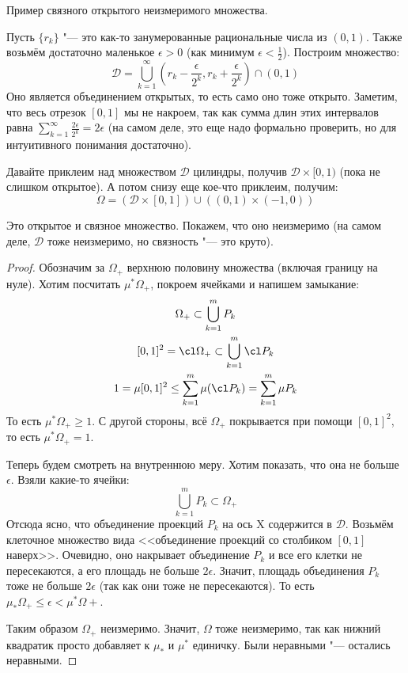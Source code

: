\begin{exmp}
	Пример связного открытого неизмеримого множества.

	Пусть $\{ r_k \}$ "--- это как-то занумерованные рациональные числа из $(0,1)$.
	Также возьмём достаточно маленькое $\epsilon > 0$ (как минимум $\epsilon < \frac 1 2$).
	Построим множество:
	\[
	\mathcal{D} = \bigcup_{k=1}^\infty \left(r_k - \frac{\epsilon}{2^k}, r_k + \frac{\epsilon}{2^k}\right) \cap (0,1)
	\]
	Оно является объединением открытых, то есть само оно тоже открыто.
	Заметим, что весь отрезок $[0,1]$ мы не накроем, так как сумма длин этих интервалов равна
	$\sum_{k=1}^\infty \frac{2\epsilon}{2^k} = 2\epsilon$
	(на самом деле, это еще надо формально проверить, но для интуитивного понимания достаточно).

	Давайте приклеим над множеством $\mathcal{D}$ цилиндры, получив $\mathcal{D} \times [0,1)$
	(пока не слишком открытое).
	А потом снизу еще кое-что приклеим, получим:
	\[ \Omega = (\mathcal{D} \times [0,1]) \cup ((0,1) \times (-1, 0)) \]
	\begin{center}
	
	\end{center}
	Это открытое и связное множество.
	Покажем, что оно неизмеримо (на самом деле, $\mathcal{D}$ тоже неизмеримо, но связность "--- это круто).
\end{exmp}
\begin{proof}
	Обозначим за $\Omega_+$ верхнюю половину множества (включая границу на нуле).
	Хотим посчитать $\mu^* \Omega_+$, покроем ячейками и напишем замыкание:
	\begin{gather*}
		\Omega_+ \subset \bigcup_{k=1}^m P_k \\
		[0,1]^2 = \cl \Omega_+ \subset \bigcup_{k=1}^m \cl P_k \\
		1 = \mu [0,1]^2 \le \sum_{k=1}^m \mu(\cl P_k) = \sum_{k=1}^m \mu P_k
	\end{gather*}
	То есть $\mu^* \Omega_+ \ge 1$.
	С другой стороны, всё $\Omega_+$ покрывается при помощи $[0,1]^2$, то есть $\mu^* \Omega_+ = 1$.

	Теперь будем смотреть на внутреннюю меру.
	Хотим показать, что она не больше $\epsilon$.
	Взяли какие-то ячейки:
	\[
	\bigcup_{k=1}^m P_k \subset \Omega_+
	\]
	Отсюда ясно, что объединение проекций $P_k$ на ось X содержится в $\mathcal{D}$.
	Возьмём клеточное множество вида <<объединение проекций со столбиком $[0,1]$ наверх>>.
	Очевидно, оно накрывает объединение $P_k$ и все его клетки не пересекаются,
	а его площадь не больше $2 \epsilon$.
	Значит, площадь объединения $P_k$ тоже не больше $2\epsilon$ (так как они тоже не пересекаются).
	То есть $\mu_* \Omega_+ \le \epsilon < \mu^* \Omega+$.

	Таким образом $\Omega_+$ неизмеримо.
	Значит, $\Omega$ тоже неизмеримо, так как нижний квадратик просто добавляет к $\mu_*$ и $\mu^*$ единичку.
	Были неравными "--- остались неравными.
\end{proof}

